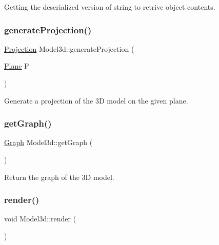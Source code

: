 Getting the deserialized version of string to retrive object contents. 

\mbox{\label{class_model3d_a3291f4f760e39b1bf5b6e62a3ea3ed83}} 
\subsubsection{\texorpdfstring{generate\+Projection()}{generateProjection()}}
{\footnotesize\ttfamily \mbox{\hyperlink{class_projection}{Projection}} Model3d\+::generate\+Projection (\begin{DoxyParamCaption}\item[{\mbox{\hyperlink{class_plane}{Plane}}}]{P }\end{DoxyParamCaption})}



Generate a projection of the 3D model on the given plane. 

\mbox{\label{class_model3d_af1a05008f590aa70b58a9d4ff02574a8}} 
\subsubsection{\texorpdfstring{get\+Graph()}{getGraph()}}
{\footnotesize\ttfamily \mbox{\hyperlink{class_graph}{Graph}} Model3d\+::get\+Graph (\begin{DoxyParamCaption}{ }\end{DoxyParamCaption})}



Return the graph of the 3D model. 

\mbox{\label{class_model3d_a22625c8d30e89f11d8b11530db2e811f}} 
\subsubsection{\texorpdfstring{render()}{render()}}
{\footnotesize\ttfamily void Model3d\+::render (\begin{DoxyParamCaption}{ }\end{DoxyParamCaption})}



